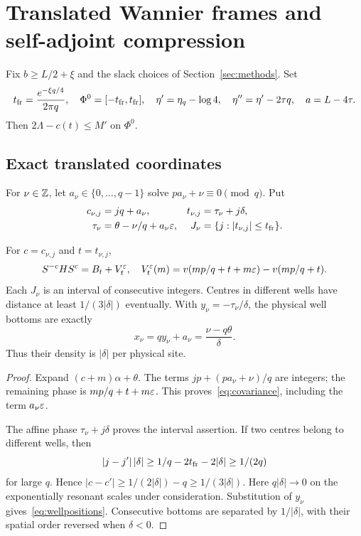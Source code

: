 \section{Translated Wannier frames and self-adjoint compression}\label{app:frames}
Fix $b\ge L/2+\xi$ and the slack choices of Section~\ref{sec:methods}. Set
\[
 t_{\rm fr}=\frac{e^{-\xi q/4}}{2\pi q},\quad
 \Phi^0=[-t_{\rm fr},t_{\rm fr}],\quad
 \eta'=\eta_q-\log4,\quad \eta''=\eta'-2\tau q,
 \quad a=L-4\tau.
\]
Then $2\Lambda-c(t)\le M'$ on $\Phi^0$.

\subsection{Exact translated coordinates}
For $\nu\in\mathbb Z$, let $a_\nu\in\{0,\ldots,q-1\}$ solve
$pa_\nu+\nu\equiv0\pmod q$. Put
\begin{equation}\label{eq:anchors}
 \begin{aligned}
 c_{\nu,j}&=jq+a_\nu,&
 t_{\nu,j}&=\tau_\nu+j\delta,\\
 \tau_\nu&=\theta-\nu/q+a_\nu\varepsilon,&
 J_\nu&=\{j:|t_{\nu,j}|\le t_{\rm fr}\}.
 \end{aligned}
\end{equation}

\begin{lemma}\label{lem:anchors}
For $c=c_{\nu,j}$ and $t=t_{\nu,j}$,
\begin{equation}\label{eq:covariance}
 S^{-c}HS^c=B_t+V_t^\varepsilon,\quad
 V_t^\varepsilon(m)=v(mp/q+t+m\varepsilon)-v(mp/q+t).
\end{equation}
Each $J_\nu$ is an interval of consecutive integers. Centres in different wells have distance at least $1/(3|\delta|)$ eventually. With $y_\nu=-\tau_\nu/\delta$, the physical well bottoms are exactly
\begin{equation}\label{eq:wellpositions}
 x_\nu=qy_\nu+a_\nu=\frac{\nu-q\theta}{\delta}.
\end{equation}
Thus their density is $|\delta|$ per physical site.
\end{lemma}
\begin{proof}
Expand $(c+m)\alpha+\theta$. The terms $jp+(pa_\nu+\nu)/q$ are integers; the remaining phase is $mp/q+t+m\varepsilon$. This proves~\eqref{eq:covariance}, including the term $a_\nu\varepsilon$.

The affine phase $\tau_\nu+j\delta$ proves the interval assertion. If two centres belong to different wells, then
\[
 |j-j'|\,|\delta|\ge1/q-2t_{\rm fr}-2|\delta|\ge1/(2q)
\]
for large $q$. Hence $|c-c'|\ge1/(2|\delta|)-q\ge1/(3|\delta|)$. Here $q|\delta|\to0$ on the exponentially resonant scales under consideration. Substitution of $y_\nu$ gives~\eqref{eq:wellpositions}. Consecutive bottoms are separated by $1/|\delta|$, with their spatial order reversed when $\delta<0$.
\end{proof}

